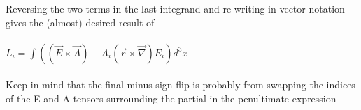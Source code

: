 \documentclass[prb,preprint]
{revtex4-1}
\newcommand{\PRLsep}{\noindent\makebox[\linewidth]{\resizebox{0.8888\linewidth}{2pt}{$\bullet$}}\bigskip}
\begin{document}
Reversing the two terms in the last integrand and re-writing in vector notation gives the (almost) desired result of
\\
\\
$L_i = \int \left(\left(\vec{E} \times \vec{A}\right) - A_i \left(\vec{r}\times\vec{\nabla}\right) E_i\right) d^3x$
\\
\\
Keep in mind that the final minus sign flip is probably from swapping the indices of the E and A tensors surrounding the partial in the penultimate expression
\\
\\
\PRLsep
\\
\\
\\
\\



\end{document}
